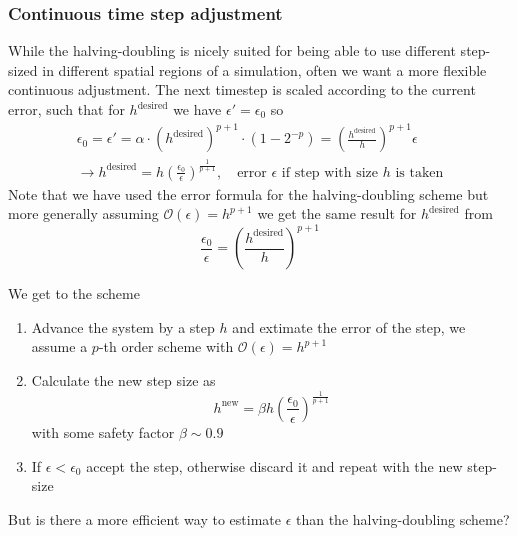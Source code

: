 \subsubsection{Continuous time step adjustment}
While the halving-doubling is nicely suited for being able to use different step-sized in different
spatial regions of a simulation, often we want a more flexible continuous adjustment.
The next timestep is scaled according to the current error, such that for $h^{\text{desired}}$ we have
$\epsilon' = \epsilon_0$ so
\begin{equation}
  \begin{gathered}
    \epsilon_0 = \epsilon' = \alpha \cdot \left( h^{\text{desired}} \right) ^{p+1} \cdot (1-2^{-p}) = \left( \frac{h^{\text{desired}}}{h} \right)^{p+1} \epsilon \\
    \rightarrow h^{\text{desired}} = h \left( \frac{\epsilon_0}{\epsilon} \right) ^ {\frac{1}{p+1}}, \quad \text{error } \epsilon \text{ if step with size } h \text{ is taken} 
  \end{gathered}
\end{equation}
Note that we have used the error formula for the halving-doubling scheme but more generally assuming $\mathcal{O}(\epsilon) = h^{p+1}$
we get the same result for $h^{\text{desired}}$ from
\begin{equation}
  \frac{\epsilon_0}{\epsilon} = \left(\frac{h^{\text{desired}}}{h}\right)^{p+1}
\end{equation}

We get to the scheme
\begin{enumerate}
  \item Advance the system by a step $h$ and extimate the error of the step, we assume a $p$-th order scheme with $\mathcal{O}(\epsilon) = h^{p+1}$
  \item Calculate the new step size as \begin{equation} h^{\text{new}} = \beta h \left( \frac{\epsilon_0}{\epsilon} \right)^{\frac{1}{p+1}} \end{equation} with some safety factor $\beta \sim 0.9$
  \item If $\epsilon < \epsilon_0$ accept the step, otherwise discard it and repeat with the new step-size
\end{enumerate}
But is there a more efficient way to estimate $\epsilon$ than the halving-doubling scheme?

